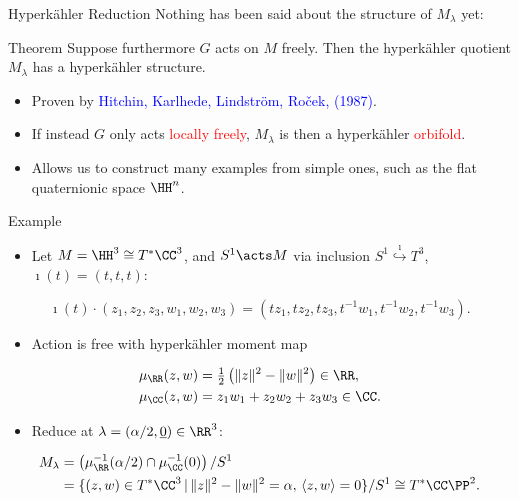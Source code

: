 \begin{frame}{Hyperk\"ahler Reduction}
    Nothing has been said about the structure of $M_{\lambda}$ yet:
    \begin{block}{Theorem}
        Suppose furthermore $G$ acts on $M$ freely. Then the hyperk\"ahler quotient $M_{\lambda}$ has a hyperk\"ahler structure.
    \end{block}
    \begin{itemize}
        \item Proven by \textcolor{blue}{Hitchin, Karlhede, Lindstr\"om, Ro\v{c}ek, (1987)}.
        \item If instead $G$ only acts \textcolor{red}{locally freely}, $M_{\lambda}$ is then a hyperk\"ahler \textcolor{red}{orbifold}.
        \item Allows us to construct many examples from simple ones, such as the flat quaternionic space $\HH^{n}$.
    \end{itemize}
\end{frame}

\begin{frame}{Example}
    \begin{itemize}
        \item Let $M = \HH^{3} \cong T^{\ast}\CC^{3}$, and $S^{1} \acts M$ via inclusion $S^{1} \overset{\imath}{\hookrightarrow} T^{3}$, $\imath(t) = (t,t,t)$:
    \end{itemize}
    \[
        \imath(t) \cdot (z_{1},z_{2},z_{3}, w_{1}, w_{2}, w_{3}) = (tz_{1},tz_{2},tz_{3}, t^{-1}w_{1}, t^{-1}w_{2}, t^{-1}w_{3}).    
    \]
    \vspace{-20pt}
    \begin{itemize}
        \item Action is free with hyperk\"ahler moment map
    \end{itemize}
    \begin{align*}
        \mu_{\RR}(z,w) &= \tfrac{1}{2}\left(\|z\|^{2} - \|w\|^{2}\right) \in \RR, \\
        \mu_{\CC}(z,w) &= z_{1}w_{1} + z_{2}w_{2} + z_{3}w_{3} \in \CC.
    \end{align*}
    \vspace{-20pt}
    \begin{itemize}
        \item Reduce at $\lambda = (\alpha/2,\underline{0}) \in \RR^{3}$:
    \end{itemize}
    \begin{align*}
        M_{\lambda} &= \left(\mu_{\RR}^{-1}(\alpha/2) \cap \mu_{\CC}^{-1}(0)\right)/S^{1} \\
        &= \{(z,w) \in T^{\ast}\CC^{3}\, |\, \|z\|^{2} - \|w\|^{2} = \alpha,\, \langle z, w \rangle = 0 \}/S^{1} \cong T^{\ast}\CC\PP^{2}.
    \end{align*}
\end{frame}

